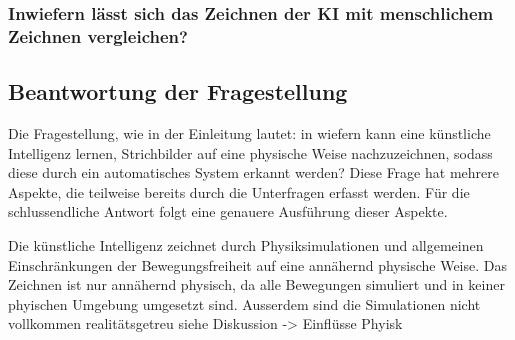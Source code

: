 \subsubsection*{Inwiefern lässt sich das Zeichnen der KI mit menschlichem Zeichnen vergleichen?}


\subsection{Beantwortung der Fragestellung}
Die Fragestellung, wie in der Einleitung lautet: in wiefern kann eine künstliche
Intelligenz lernen, Strichbilder auf eine physische Weise nachzuzeichnen, sodass
diese durch ein automatisches System erkannt werden? Diese Frage hat mehrere
Aspekte, die teilweise bereits durch die Unterfragen erfasst werden. Für die
schlussendliche Antwort folgt eine genauere Ausführung dieser Aspekte.

Die künstliche Intelligenz zeichnet durch Physiksimulationen und allgemeinen
Einschränkungen der Bewegungsfreiheit auf eine annähernd physische Weise. Das
Zeichnen ist nur annähernd physisch, da alle Bewegungen simuliert und in
keiner phyischen Umgebung umgesetzt sind. Ausserdem sind die Simulationen
nicht vollkommen realitätsgetreu {siehe Diskussion -> Einflüsse Phyisk }

